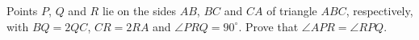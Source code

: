 Points $P$, $Q$ and $R$ lie on the sides $AB$, $BC$ and $CA$ of triangle $ABC$, respectively, with $BQ=2QC$, $CR=2RA$ and $\angle PRQ=90^\circ$. Prove that $\angle APR=\angle RPQ$.
